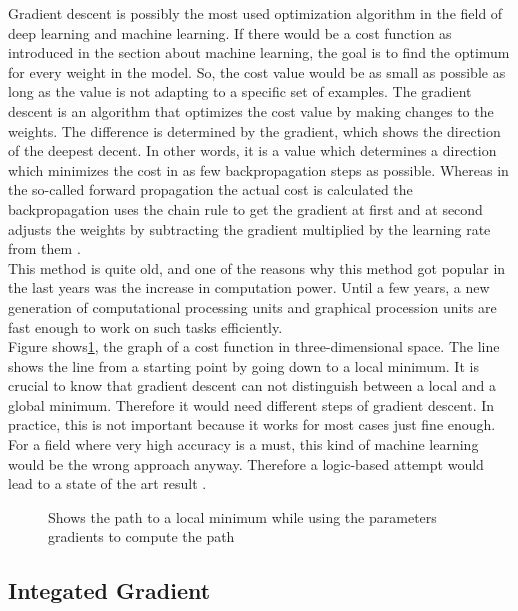 Gradient descent is possibly the most used optimization algorithm in the field of deep learning and machine learning. If there would be a cost function as introduced in the section about machine learning, the goal is to find the optimum for every weight in the model. So, the cost value would be as small as possible as long as the value is not adapting to a specific set of examples. The gradient descent is an algorithm that optimizes the cost value by making changes to the weights. The difference is determined by the gradient, which shows the direction of the deepest decent. In other words, it is a value which determines a direction which minimizes the cost in as few backpropagation steps as possible. Whereas in the so-called forward propagation the actual cost is calculated the backpropagation uses the chain rule to get the gradient at first and at second adjusts the weights by subtracting the gradient multiplied by the learning rate from them \cite{Goodfellow-et-al-2016}.\\

This method is quite old, and one of the reasons why this method got popular in the last years was the increase in computation power. Until a few years, a new generation of computational processing units and graphical procession units are fast enough to work on such tasks efficiently. \\

Figure shows\ref{fig:gd}, the graph of a cost function in three-dimensional space. The line shows the line from a starting point by going down to a local minimum. It is crucial to know that gradient descent can not distinguish between a local and a global minimum. Therefore it would need different steps of gradient descent. In practice, this is not important because it works for most cases just fine enough. For a  field where very high accuracy is a must, this kind of machine learning would be the wrong approach anyway. Therefore a logic-based attempt would lead to a state of the art result \cite{Russell} \cite{conf/mkm/KohlhaseKMT17}. 

\begin{figure}[htp]
	\centering
	\caption{Shows the path to a local minimum while using the parameters gradients to compute the path \cite{Gradient47:online}}
	\label{fig:gd}
\end{figure}

\subsection{Integated Gradient}
\label{subsec:ig}

